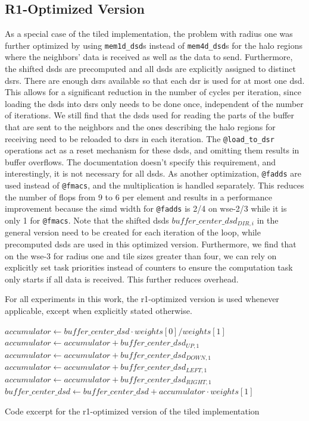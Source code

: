 \subsection{R1-Optimized Version}

As a special case of the tiled implementation, the problem with radius one was further optimized by using \texttt{mem1d\_dsd}s instead of \texttt{mem4d\_dsd}s for the halo regions where the neighbors' data is received as well as the data to send. Furthermore, the shifted \acp{dsd} are precomputed and all \acp{dsd} are explicitly assigned to distinct \acp{dsr}.
There are enough \acp{dsr} available so that each \ac{dsr} is used for at most one \ac{dsd}. This allows for a significant reduction in the number of cycles per iteration, since loading the \acp{dsd} into \acp{dsr} only needs to be done once, independent of the number of iterations.
We still find that the \acp{dsd} used for reading the parts of the buffer that are sent to the neighbors and the ones describing the halo regions for receiving need to be reloaded to \acp{dsr} in each iteration.
The \texttt{@load\_to\_dsr} operations act as a reset mechanism for these \acp{dsd}, and omitting them results in buffer overflows.
The documentation doesn't specify this requirement, and interestingly, it is not necessary for all \acp{dsd}. 
As another optimization, \texttt{@fadds} are used instead of \texttt{@fmacs}, and the multiplication is handled separately. This reduces the number of \acp{flop} from $9$ to $6$ per element and results in a performance improvement because the \ac{simd} width for \texttt{@fadds} is 2/4 on \ac{wse}-2/3 while it is only 1 for \texttt{@fmacs}. Note that the shifted \acp{dsd} $buffer\_center\_dsd_{DIR,i}$ in the general version need to be created for each iteration of the loop, while precomputed \acp{dsd} are used in this optimized version.
Furthermore, we find that on the \ac{wse}-3 for radius one and tile sizes greater than four, we can rely on explicitly set task priorities instead of counters to ensure the computation task only starts if all data is received. This further reduces overhead. 

For all experiments in this work, the r1-optimized version is used whenever applicable, except when explicitly stated otherwise.

\begin{algorithm}[tbh]
    \SetAlgoLined
    $accumulator \gets buffer\_center\_dsd \cdot weights[0]/weights[1]$\;
    $accumulator \gets accumulator + buffer\_center\_dsd_{UP,1}$\;
    $accumulator \gets accumulator + buffer\_center\_dsd_{DOWN,1}$\;
    $accumulator \gets accumulator + buffer\_center\_dsd_{LEFT,1}$\;
    $accumulator \gets accumulator + buffer\_center\_dsd_{RIGHT,1}$\;
    $buffer\_center\_dsd \gets buffer\_center\_dsd + accumulator \cdot weights[1]$\;
    \caption{Code excerpt for the r1-optimized version of the tiled implementation}\label{alg:r1_tiled_algorithm}
\end{algorithm}


